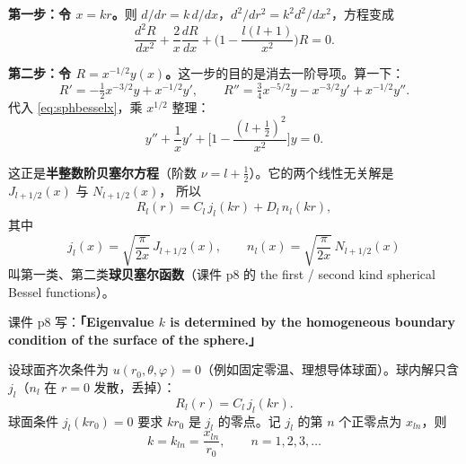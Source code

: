 \textbf{第一步：令 $x=kr$。}则 $d/dr=k\,d/dx$，$d^2/dr^2=k^2d^2/dx^2$，方程变成
\begin{equation}
\frac{d^2R}{dx^2}+\frac{2}{x}\frac{dR}{dx}+\Big(1-\frac{l(l+1)}{x^2}\Big)R=0 .
\label{eq:sphbesselx}
\end{equation}

\textbf{第二步：令 $R=x^{-1/2}y(x)$。}这一步的目的是消去一阶导项。算一下：
\[
R'=-\tfrac12x^{-3/2}y+x^{-1/2}y',\qquad
R''=\tfrac34x^{-5/2}y-x^{-3/2}y'+x^{-1/2}y'' .
\]
代入 \eqref{eq:sphbesselx}，乘 $x^{1/2}$ 整理：
\begin{equation}
y''+\frac{1}{x}y'+\Big[1-\frac{(l+\frac12)^2}{x^2}\Big]y=0 .
\label{eq:halfbessel}
\end{equation}

这正是\textbf{半整数阶贝塞尔方程}（阶数 $\nu=l+\tfrac12$）。它的两个线性无关解是 $J_{l+1/2}(x)$ 与 $N_{l+1/2}(x)$，
所以
\begin{equation}
R_l(r)=C_l\,j_l(kr)+D_l\,n_l(kr),
\label{eq:Rbessel}
\end{equation}
其中
\begin{equation}
j_l(x)=\sqrt{\frac{\pi}{2x}}\,J_{l+1/2}(x),\qquad
n_l(x)=\sqrt{\frac{\pi}{2x}}\,N_{l+1/2}(x)
\label{eq:jlnl}
\end{equation}
叫第一类、第二类\textbf{球贝塞尔函数}（课件 p8 的 the first / second kind spherical Bessel functions）。



课件 p8 写：\textbf{「Eigenvalue $k$ is determined by the homogeneous boundary condition of the surface of the sphere.」}

设球面齐次条件为 $u(r_0,\theta,\varphi)=0$（例如固定零温、理想导体球面）。球内解只含 $j_l$（$n_l$ 在 $r=0$ 发散，丢掉）：
\[
R_l(r)=C_l\,j_l(kr).
\]
球面条件 $j_l(kr_0)=0$ 要求 $kr_0$ 是 $j_l$ 的零点。记 $j_l$ 的第 $n$ 个正零点为 $x_{ln}$，则
\begin{equation}
k=k_{ln}=\frac{x_{ln}}{r_0},\qquad n=1,2,3,\dots
\label{eq:kln}
\end{equation}


